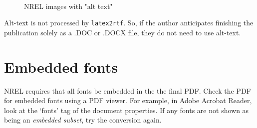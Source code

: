 \begin{figure}[!h]
\centering
\hfill
{}
~ %
\hfill
{}
\hfill
\caption{NREL images with "alt text"}\label{fig:NRELimagesWithAltText}
\end{figure}

Alt-text is not processed by \texttt{latex2rtf}. So, if the author anticipates finishing the publication solely as a .DOC or .DOCX file, they do not need to use alt-text.

\section{Embedded fonts}
NREL requires that all fonts be embedded in the the final PDF. Check the PDF for embedded fonts using a PDF viewer. For example, in Adobe Acrobat Reader, look at the `fonts' tag of the document properties. If any fonts are not shown as being an \emph{embedded subset}, try the conversion again. 


